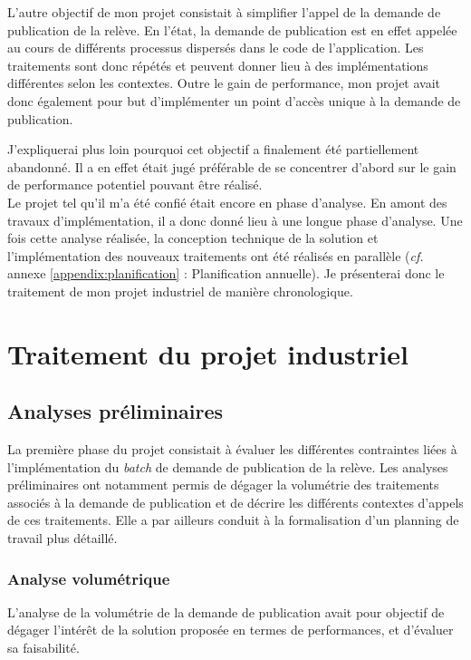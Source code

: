 \documentclass[a4paper, 12pt]{report}
\begin{document}
L'autre objectif de mon projet consistait à simplifier l'appel de la demande de publication de la relève. En l'état, la demande de publication est en effet appelée au cours de différents processus dispersés dans le code de l'application. Les traitements sont donc répétés et peuvent donner lieu à des implémentations différentes selon les contextes. Outre le gain de performance, mon projet avait donc également pour but d'implémenter un point d'accès unique à la demande de publication.

J'expliquerai plus loin pourquoi cet objectif a finalement été partiellement abandonné. Il a en effet était jugé préférable de se concentrer d'abord sur le gain de performance potentiel pouvant être réalisé.\\

Le projet tel qu'il m'a été confié était encore en phase d'analyse. En amont des travaux d'implémentation, il a donc donné lieu à une longue phase d'analyse. Une fois cette analyse réalisée, la conception technique de la solution et l'implémentation des nouveaux traitements ont été réalisés en parallèle (\textit{cf.} annexe \ref{appendix:planification} : Planification annuelle). Je présenterai donc le traitement de mon projet industriel de manière chronologique.

\chapter{Traitement du projet industriel}

\section{Analyses préliminaires}

La première phase du projet consistait à évaluer les différentes contraintes liées à l'implémentation du \textit{batch} de demande de publication de la relève. Les analyses préliminaires ont notamment permis de dégager la volumétrie des traitements associés à la demande de publication et de décrire les différents contextes d'appels de ces traitements. Elle a par ailleurs conduit à la formalisation d'un planning de travail plus détaillé.

\subsection{Analyse volumétrique}

L'analyse de la volumétrie de la demande de publication avait pour objectif de dégager l'intérêt de la solution proposée en termes de performances, et d'évaluer sa faisabilité.\\
\end{document}
